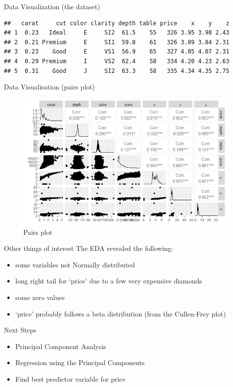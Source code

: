 \documentclass[
  ignorenonframetext,
]{beamer}
\providecommand{\tightlist}{%
  \setlength{\itemsep}{0pt}\setlength{\parskip}{0pt}}
\begin{document}
\begin{frame}[fragile]{Data Visualization (the dataset)}
\protect\hypertarget{data-visualization-the-dataset}{}
\footnotesize

\begin{verbatim}
##   carat     cut color clarity depth table price    x    y    z
## 1  0.23   Ideal     E     SI2  61.5    55   326 3.95 3.98 2.43
## 2  0.21 Premium     E     SI1  59.8    61   326 3.89 3.84 2.31
## 3  0.23    Good     E     VS1  56.9    65   327 4.05 4.07 2.31
## 4  0.29 Premium     I     VS2  62.4    58   334 4.20 4.23 2.63
## 5  0.31    Good     J     SI2  63.3    58   335 4.34 4.35 2.75
\end{verbatim}

\normalsize
\end{frame}

\begin{frame}{Data Visualisation (pairs plot)}
\protect\hypertarget{data-visualisation-pairs-plot}{}
\begin{figure}
\centering
\includegraphics{./pairs plot.jpg}
\caption{Pairs plot}
\end{figure}
\end{frame}

\begin{frame}{Other things of interest}
\protect\hypertarget{other-things-of-interest}{}
The EDA revealed the following:

\begin{itemize}
\tightlist
\item
  some variables not Normally distributed\linebreak
\item
  long right tail for `price' due to a few very expensive
  diamonds\linebreak
\item
  some zero values\linebreak
\item
  `price' probably follows a beta distribution (from the Cullen-Frey
  plot)
\end{itemize}
\end{frame}

\begin{frame}{Next Steps}
\protect\hypertarget{next-steps}{}
\begin{itemize}
\tightlist
\item
  Principal Component Analysis\linebreak
\item
  Regression using the Principal Components\linebreak
\item
  Find best predictor variable for price
\end{itemize}
\end{frame}
\end{document}
